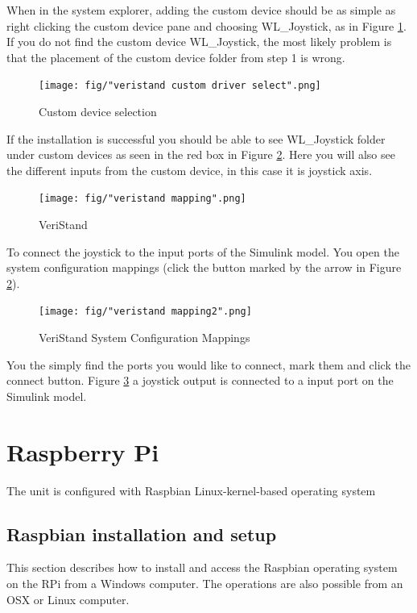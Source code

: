 When in the system explorer, adding the custom device should be as simple as right clicking the custom device pane and choosing WL\_Joystick, as in Figure \ref{fig: custom device selection}. If you do not find the custom device WL\_Joystick, the most likely problem is that the placement of the custom device folder from step 1 is wrong.
\begin{figure}[htb!]
	\centering \texttt{[image: fig/"veristand custom driver select".png]}
	\caption{Custom device selection}
	\label{fig: custom device selection} 
\end{figure}
If the installation is successful you should be able to see WL\_Joystick folder under custom devices as seen in the red box in Figure \ref{fig: veristand confirmation}. Here you will also see the different inputs from the custom device, in this case it is joystick axis.
\begin{figure}[htb!]
	\centering \texttt{[image: fig/"veristand mapping".png]}
	\caption{VeriStand}
	\label{fig: veristand confirmation} 
\end{figure}
To connect the joystick to the input ports of the Simulink model. You open the system configuration mappings (click the button marked by the arrow in Figure \ref{fig: veristand confirmation}).
\begin{figure}[htb!]
	\centering \texttt{[image: fig/"veristand mapping2".png]}
	\caption{VeriStand System Configuration Mappings}
	\label{fig: veristand mappings} 
\end{figure}
You the simply find the ports you would like to connect, mark them and click the connect button. Figure \ref{fig: veristand mappings} a joystick output is connected to a input port on the Simulink model.
\section{Raspberry Pi}\label{subsec: RPi setup}
The unit is configured with Raspbian Linux-kernel-based operating system 
\subsection{Raspbian installation and setup}
This section describes how to install and access the Raspbian operating system on the RPi from a Windows computer. The operations are also possible from an OSX or Linux computer.
